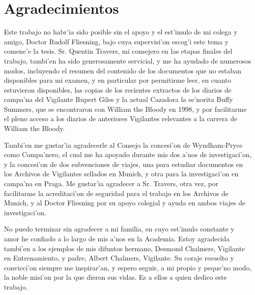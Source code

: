 
\chapter{Agradecimientos}

Este trabajo no habr'ia sido posible sin el apoyo y el est'imulo de mi colega
y amigo, Doctor Rudolf Fliesning,  bajo cuya supervisi'on escog'i este tema y
comenc'e la tesis. Sr. Quentin Travers, mi consejero en las etapas finales
del trabajo, tambi'en ha sido generosamente servicial, y me ha ayudado de
numerosos modos, incluyendo el resumen del contenido de los documentos que
no estaban disponibles para mi examen, y en particular por permitirme leer, 
en cuanto estuvieron  disponibles, las copias de los  recientes extractos de
los diarios de campa'na del Vigilante Rupert Giles y la actual Cazadora la
se'norita Buffy Summers, que se encontraron con William the Bloody en 1998, y
por facilitarme el pleno acceso  a los diarios de anteriores Vigilantes
relevantes a la carrera de William the Bloody.

Tambi'en me gustar'ia agradecerle al Consejo la concesi'on de Wyndham-Pryce
como Compa'nero, el cual me ha apoyado durante mis dos a'nos de investigaci'on,
y la concesi'on de dos subvenciones de viajes, una para estudiar documentos
en los Archivos de Vigilantes sellados en Munich, y otra para la
investigaci'on en campa'na en Praga. Me gustar'ia agradecer a Sr. Travers,
otra vez, por facilitarme  la acreditaci'on  de seguridad para el trabajo en
los Archivos de Munich, y al Doctor Fliesning por su apoyo colegial y ayuda
en ambos viajes de investigaci'on.

No puedo terminar sin agradecer a mi familia, en cuyo est'imulo constante y
amor he confiado a lo largo de mis a'nos en la Academia. Estoy agradecida
tambi'en a los ejemplos de mis  difuntos hermano, Desmond Chalmers, Vigilante
en Entrenamiento, y padre, Albert Chalmers, Vigilante. Su coraje resuelto
y convicci'on siempre me inspirar'an, y espero seguir, a mi propio y peque'no
modo, la noble misi'on por la que dieron sus vidas. Es a ellos a quien dedico
este trabajo.

